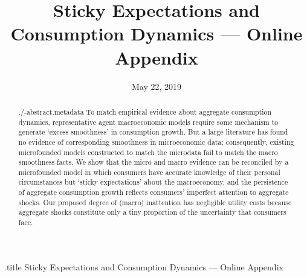 \documentclass[titlepage]{\econtex}
\begin{document}

	
	
	
	\begin{verbatimwrite}{\jobname.title}
		Sticky Expectations and Consumption Dynamics --- Online Appendix
	\end{verbatimwrite}
	
	\hfill{\tiny \jobname}
	
	\title{Sticky Expectations and Consumption Dynamics --- Online Appendix}
	
	
	
	
	
	\date{May 22, 2019}
	\maketitle
	
	\hypertarget{Abstract}{}
	\begin{abstract}
		\begin{verbatimwrite}{./\jobname-abstract.metadata}
			To match empirical evidence about aggregate consumption dynamics, representative agent macroeconomic models require some mechanism to generate `excess smoothness' in consumption growth.   But a large literature has found no evidence of corresponding smoothness in microeconomic data; consequently, existing microfounded models constructed to match the microdata fail to match the macro smoothness facts.  We show that the micro and macro evidence can be reconciled by a microfounded model in which consumers have accurate knowledge of their personal circumstances but `sticky expectations' about the macroeconomy, and the persistence of aggregate consumption growth reflects consumers' imperfect attention to aggregate shocks. Our proposed degree of (macro) inattention has negligible utility costs because aggregate shocks constitute only a tiny proportion of the uncertainty that consumers face.
		\end{verbatimwrite}
		
	\end{abstract}
	
\end{document}
